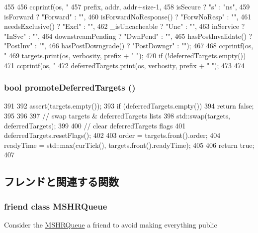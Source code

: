 \begin{DoxyCode}
455 {
456     ccprintf(os, "%
457              prefix, addr, addr+size-1,
458              isSecure ? "s" : "ns",
459              isForward ? "Forward" : "",
460              isForwardNoResponse() ? "ForwNoResp" : "",
461              needsExclusive() ? "Excl" : "",
462              _isUncacheable ? "Unc" : "",
463              inService ? "InSvc" : "",
464              downstreamPending ? "DwnPend" : "",
465              hasPostInvalidate() ? "PostInv" : "",
466              hasPostDowngrade() ? "PostDowngr" : "");
467 
468     ccprintf(os, "%
469     targets.print(os, verbosity, prefix + "    ");
470     if (!deferredTargets.empty()) {
471         ccprintf(os, "%
472         deferredTargets.print(os, verbosity, prefix + "      ");
473     }
474 }
\end{DoxyCode}
\hypertarget{classMSHR_a6b0d016d76a2a7570d1d51eaa3086845}{
\subsubsection[{promoteDeferredTargets}]{\setlength{\rightskip}{0pt plus 5cm}bool promoteDeferredTargets ()}}
\label{classMSHR_a6b0d016d76a2a7570d1d51eaa3086845}



\begin{DoxyCode}
391 {
392     assert(targets.empty());
393     if (deferredTargets.empty()) {
394         return false;
395     }
396 
397     // swap targets & deferredTargets lists
398     std::swap(targets, deferredTargets);
399 
400     // clear deferredTargets flags
401     deferredTargets.resetFlags();
402 
403     order = targets.front().order;
404     readyTime = std::max(curTick(), targets.front().readyTime);
405 
406     return true;
407 }
\end{DoxyCode}


\subsection{フレンドと関連する関数}
\hypertarget{classMSHR_a3d057950abc60f70219bad94198fd407}{
\subsubsection[{MSHRQueue}]{\setlength{\rightskip}{0pt plus 5cm}friend class {\bf MSHRQueue}}}
\label{classMSHR_a3d057950abc60f70219bad94198fd407}
Consider the \hyperlink{classMSHRQueue}{MSHRQueue} a friend to avoid making everything public 

